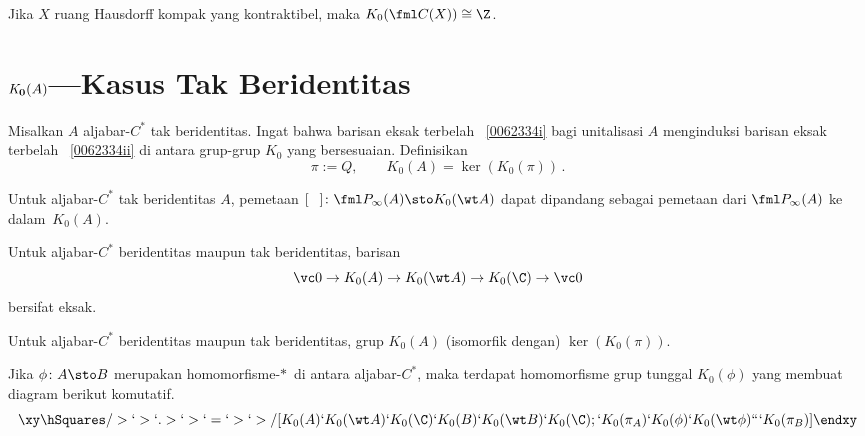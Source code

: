 \begin{exam} Jika $X$ ruang Hausdorff kompak yang kontraktibel, maka
$K_0(\fml C(X)) \cong \Z$.
\end{exam}


















\section{$\mathbf{\emph{K}_0}(A)$---Kasus Tak Beridentitas}
\begin{defn} Misalkan $A$ aljabar-$C^*$ tak beridentitas. Ingat bahwa barisan eksak terbelah
 ~\eqref{0062334i} bagi unitalisasi $A$ menginduksi barisan eksak terbelah
~\eqref{0062334ii} di antara grup-grup $K_0$ yang bersesuaian.
Definisikan
   \[ \pi:=Q,\qquad K_0(A) = \ker(K_0(\pi))\,. \] %
\end{defn}

\begin{prop}\label{0062413} Untuk aljabar-$C^*$ tak beridentitas $A$, pemetaan $[\hphantom{P}] \colon \fml
P_\infty(A) \sto K_0(\wt A)$ dapat dipandang sebagai pemetaan dari $\fml P_\infty(A)$ ke dalam~$K_0(A)$.
\end{prop}

\begin{prop}\label{0062416} Untuk aljabar-$C^*$ beridentitas maupun tak beridentitas, barisan
  \[ \vc 0 \to K_0(A) \to K_0(\wt A) \to K_0(\C) \to \vc 0 \]
bersifat eksak.
\end{prop}

\begin{prop}\label{0062418} Untuk aljabar-$C^*$ beridentitas maupun tak beridentitas, grup $K_0(A)$ (isomorfik
dengan) $\ker(K_0(\pi))$.
\end{prop}

\begin{prop}\label{0062424} Jika $\phi\colon A \sto B$ merupakan homomorfisme-$*\,$ di antara aljabar-$C^*$, maka
terdapat homomorfisme grup tunggal %
$K_0(\phi)$ yang membuat diagram berikut komutatif.
   \[\xy
     \hSquares/>`>`.>`>`=`>`>/[K_0(A)`K_0(\wt A)`K_0(\C)`K_0(B)`K_0(\wt
     B)`K_0(\C);`K_0(\pi_A)`K_0(\phi)`K_0(\wt\phi)```K_0(\pi_B)]
   \endxy\]
\end{prop}

